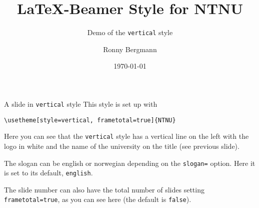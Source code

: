 \documentclass[aspectratio=169]{beamer}
\title{\LaTeX{}-Beamer Style for NTNU}
\subtitle{Demo of the  \texttt{vertical} style}
\author{Ronny Bergmann}
\date{\today}
\begin{document}
	\maketitle
		\begin{frame}[fragile]{A slide in \texttt{vertical} style}
			This style is set up with

			\lstinline!\usetheme[style=vertical, frametotal=true]{NTNU}!

			Here you can see that the \texttt{vertical} style has a vertical line on the left with the logo in white and the name of the university on the title (see previous slide).

			The slogan can be english or norwegian depending on the \lstinline!slogan=! option. Here it is set to its default, \lstinline!english!.

			The slide number can also have the total number of slides setting \lstinline!frametotal=true!,
            as you can see here (the default is \lstinline!false!).
		\end{frame}
\end{document}
